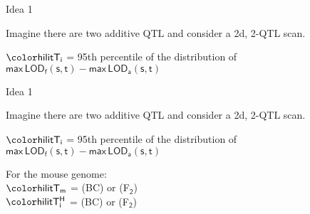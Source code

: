 \documentclass[aspectratio=169,12pt,t]{beamer}
\newcommand{\lod}{\text{LOD}}
\begin{document}
\begin{frame}{Idea 1}


\hfill \begin{minipage}{10in}

Imagine there are two additive QTL and consider a 2d, 2-QTL scan.

\vspace{1cm}

\hspace*{0.5in} $\mathsf{\hilit T_i}$ = 95th percentile of the
  distribution of \\[6pt]
\hspace*{1.3in} {\lolit $\mathsf{ \text{max} \, \lod_f(s,t) -
    \text{max} \, \lod_a(s,t)}$}


\end{minipage}



\end{frame}







\addtocounter{page}{-1}

\begin{frame}{Idea 1}


\hfill \begin{minipage}{10in}

Imagine there are two additive QTL and consider a 2d, 2-QTL scan.

\vspace{1cm}

\hspace*{0.5in} $\mathsf{\hilit T_i}$ = 95th percentile of the
  distribution of \\[6pt]
\hspace*{1.3in} {\lolit $\mathsf{ \text{max} \, \lod_f(s,t) -
    \text{max} \, \lod_a(s,t)}$}


\vspace{2cm}

For the mouse genome: \\[12pt]
\hspace*{0.5in} $\mathsf{\hilit T_m}$ = {} (BC) or {} (F$_{\mathsf{2}}$) \\[12pt]
\hspace*{0.5in} $\mathsf{\hilit T^H_i}$ = {} (BC) or {} (F$_{\mathsf{2}}$)


\end{minipage}



\end{frame}
\end{document}
